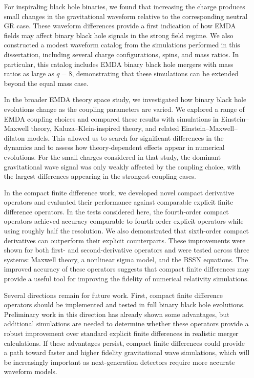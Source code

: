 For inspiraling black hole binaries, we found that increasing the charge produces small changes in the gravitational waveform relative to the corresponding neutral GR case. These waveform differences provide a first indication of how EMDA fields may affect binary black hole signals in the strong field regime. We also constructed a modest waveform catalog from the simulations performed in this dissertation, including several charge configurations, spins, and mass ratios. In particular, this catalog includes EMDA binary black hole mergers with mass ratios as large as $q=8$, demonstrating that these simulations can be extended beyond the equal mass case.

In the broader EMDA theory space study, we investigated how binary black hole evolutions change as the coupling parameters are varied. We explored a range of EMDA coupling choices and compared these results with simulations in Einstein--Maxwell theory, Kaluza--Klein-inspired theory, and related Einstein--Maxwell--dilaton models. This allowed us to search for significant differences in the dynamics and to assess how theory-dependent effects appear in numerical evolutions. For the small charges considered in that study, the dominant gravitational wave signal was only weakly affected by the coupling choice, with the largest differences appearing in the strongest-coupling cases.

In the compact finite difference work, we developed novel compact derivative operators and evaluated their performance against comparable explicit finite difference operators. In the tests considered here, the fourth-order compact operators achieved accuracy comparable to fourth-order explicit operators while using roughly half the resolution. We also demonstrated that sixth-order compact derivatives can outperform their explicit counterparts. These improvements were shown for both first- and second-derivative operators and were tested across three systems: Maxwell theory, a nonlinear sigma model, and the BSSN equations. The improved accuracy of these operators suggests that compact finite differences may provide a useful tool for improving the fidelity of numerical relativity simulations.

Several directions remain for future work. First, compact finite difference operators should be implemented and tested in full binary black hole evolutions. Preliminary work in this direction has already shown some advantages, but additional simulations are needed to determine whether these operators provide a robust improvement over standard explicit finite differences in realistic merger calculations. If these advantages persist, compact finite differences could provide a path toward faster and higher fidelity gravitational wave simulations, which will be increasingly important as next-generation detectors require more accurate waveform models.

